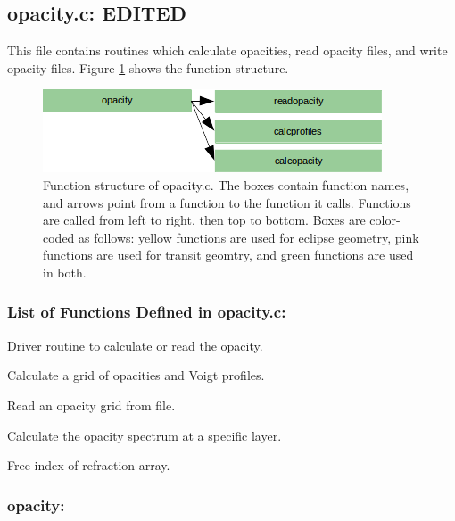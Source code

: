 \documentclass[letterpaper,12pt]{article}
\begin{document}
\newpage
\subsection{opacity.c: EDITED}
This file contains routines which calculate opacities, read opacity files, and write opacity files. Figure \ref{fig:opacityc} shows the function structure.

\begin{figure}
\includegraphics{fig/opacityc}
\caption{Function structure of opacity.c. The boxes contain function names, and arrows point from a function to the function it calls. Functions are called from left to right, then top to bottom.  Boxes are color-coded as follows:  yellow functions are used for eclipse geometry, pink functions are used for transit geomtry, and green functions are used in both.}
\label{fig:opacityc}
\end{figure}

\subsubsection{List of Functions Defined in opacity.c:}
Driver routine to calculate or read the opacity. \newline

Calculate a grid of opacities and Voigt profiles. \newline

Read an opacity grid from file. \newline

Calculate the opacity spectrum at a specific layer. \newline

Free index of refraction array. \newline

\subsubsection{opacity:}
\end{document}
